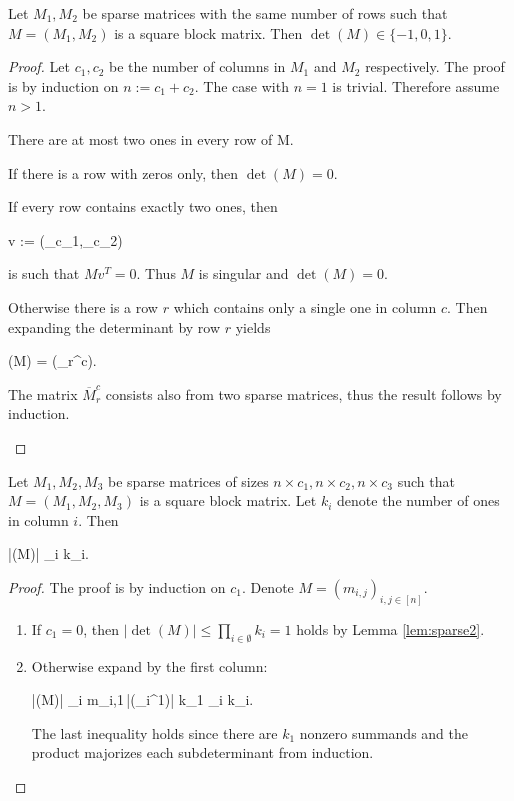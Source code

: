 \begin{lem}
\label{lem:sparse2}
Let $M_1,M_2$ be sparse matrices with the same number of rows such that $M = (M_1,M_2)$ is a square block matrix. Then $\det(M) \in \{-1,0,1\}$.
\end{lem}
\begin{proof}
Let $c_1,c_2$ be the number of columns in $M_1$ and $M_2$ respectively. The proof is by induction on $n := c_1+c_2$. The case with $n=1$ is trivial. Therefore assume $n>1$.

There are at most two ones in every row of M.
\begin{cosyitemize}
	\item If there is a row with zeros only, then $\det(M) = 0$.
	\item If every row contains exactly two ones, then
		\begin{cosyeqnarray}
			v := (_{c_1},_{c_2}) \nonumber
		\end{cosyeqnarray}%
		is such that $Mv^T = 0$. Thus $M$ is singular and $\det(M) = 0$.
	\item Otherwise there is a row $r$ which contains only a single one in column $c$. Then expanding the determinant by row $r$ yields
	 \begin{cosyeqnarray}
	 	\det(M) = \pm \det(_r^c).
	 \end{cosyeqnarray}%
	The matrix $\overbar{M}_r^c$ consists also from two sparse matrices, thus the result follows by induction.
\end{cosyitemize}
\end{proof}

\begin{lem}
\label{lem:sparse3}
Let $M_1,M_2,M_3$ be sparse matrices of sizes $n \times c_1, n \times c_2, n \times c_3$ such that $M = (M_1,M_2,M_3)$ is a square block matrix. Let $k_i$ denote the number of ones in column $i$. Then
\begin{cosyeqnarray}
	|\det(M)| \leq \prod_{i \in [c_1]} k_i.
\end{cosyeqnarray}%
\end{lem}
\begin{proof}
The proof is by induction on $c_1$. Denote $M = (m_{i,j})_{i,j \in[n]}$.
\begin{enumerate}
	\item If $c_1 = 0$, then $|\det(M)| \leq \prod_{i\in\emptyset} k_i = 1$ holds by Lemma \ref{lem:sparse2}.
	\item Otherwise expand by the first column:
	\begin{cosyeqnarray}
		|\det(M)| \leq \sum_{i\in[n]} m_{i,1}\,|\det(_i^1)| \leq k_1 \prod_{i \in [2, c_1]} k_i.
	\end{cosyeqnarray}%
	The last inequality holds since there are $k_1$ nonzero summands and the product majorizes each subdeterminant from induction.
\end{enumerate}
\end{proof}

